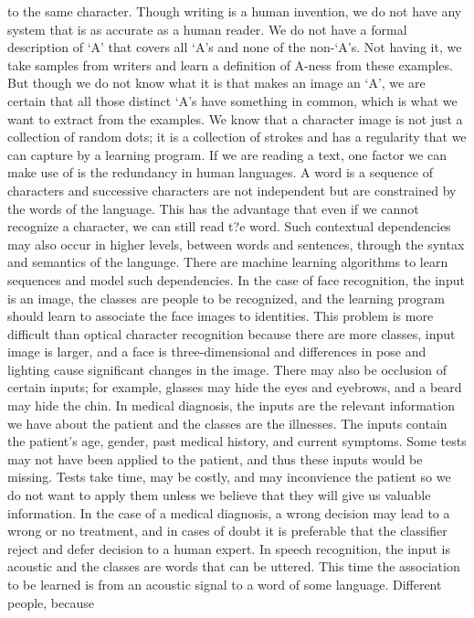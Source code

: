 to the same character. Though writing is a human invention, we do not have any system that is as accurate as a human reader. We do not have a formal description of ‘A’ that covers all ‘A’s and none of the non-‘A’s. Not having it, we take samples from writers and learn a definition of A-ness from these examples. But though we do not know what it is that makes an image an ‘A’, we are certain that all those distinct ‘A’s have something in common, which is what we want to extract from the examples. We know that a character image is not just a collection of random dots; it is a collection of strokes and has a regularity that we can capture by a learning program. If we are reading a text, one factor we can make use of is the redundancy in human languages. A word is a sequence of characters and successive characters are not independent but are constrained by the words of the language. This has the advantage that even if we cannot recognize a character, we can still read t?e word. Such contextual dependencies may also occur in higher levels, between words and sentences, through the syntax and semantics of the language. There are machine learning algorithms to learn sequences and model such dependencies. In the case of face recognition, the input is an image, the classes are people to be recognized, and the learning program should learn to associate the face images to identities. This problem is more difficult than optical character recognition because there are more classes, input image is larger, and a face is three-dimensional and differences in pose and lighting cause significant changes in the image. There may also be occlusion of certain inputs; for example, glasses may hide the eyes and eyebrows, and a beard may hide the chin. In medical diagnosis, the inputs are the relevant information we have about the patient and the classes are the illnesses. The inputs contain the patient’s age, gender, past medical history, and current symptoms. Some tests may not have been applied to the patient, and thus these inputs would be missing. Tests take time, may be costly, and may inconvience the patient so we do not want to apply them unless we believe that they will give us valuable information. In the case of a medical diagnosis, a wrong decision may lead to a wrong or no treatment, and in cases of doubt it is preferable that the classifier reject and defer decision to a human expert. In speech recognition, the input is acoustic and the classes are words that can be uttered. This time the association to be learned is from an acoustic signal to a word of some language. Different people, because

